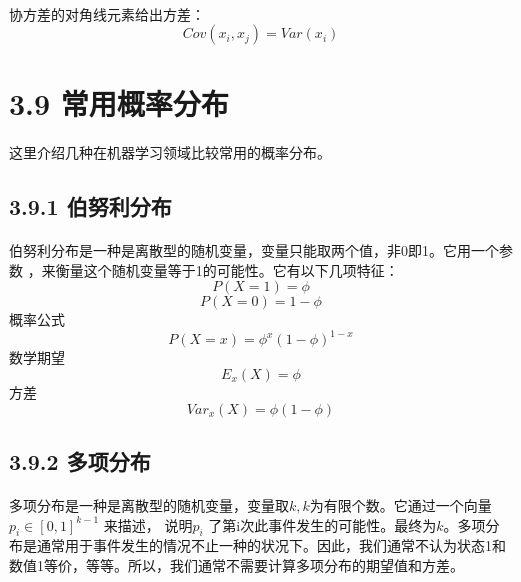 \documentclass{article}
\begin{document}
    \paragraph{}
    协方差的对角线元素给出方差：
    \begin{equation}
       Cov(x_i,x_j)=Var(x_i) \tag{3.15}
    \end{equation}


    \section*{3.9 常用概率分布}
    \paragraph{}
    这里介绍几种在机器学习领域比较常用的概率分布。
    \subsection*{3.9.1 伯努利分布}
    \paragraph{}
    伯努利分布是一种是离散型的随机变量，变量只能取两个值，非0即1。它用一个参数 ，来衡量这个随机变量等于1的可能性。它有以下几项特征：
    \begin{equation}
     P(X=1)=\phi   \tag{3.16}
    \end{equation}
    \begin{equation}
     P(X=0)=1-\phi   \tag{3.17}
    \end{equation}
    概率公式
    \begin{equation}
     P(X=x)=\phi^{x} (1-\phi)^{1-x}  \tag{3.18}
    \end{equation}
    数学期望
    \begin{equation}
     E_{x}(X)=\phi  \tag{3.19}
    \end{equation}
    方差
    \begin{equation}
     Var_{x}(X)=\phi(1-\phi)  \tag{3.20}
    \end{equation}
    \subsection*{3.9.2 多项分布}
    \paragraph{}
    多项分布是一种是离散型的随机变量，变量取$k,k$为有限个数。它通过一个向量$ p_{i}\in [0,1]^{k-1} $ 来描述， 说明$ p_{i} $ 了第i次此事件发生的可能性。最终为$k$。多项分布是通常用于事件发生的情况不止一种的状况下。因此，我们通常不认为状态1和数值1等价，等等。所以，我们通常不需要计算多项分布的期望值和方差。
\end{document}
